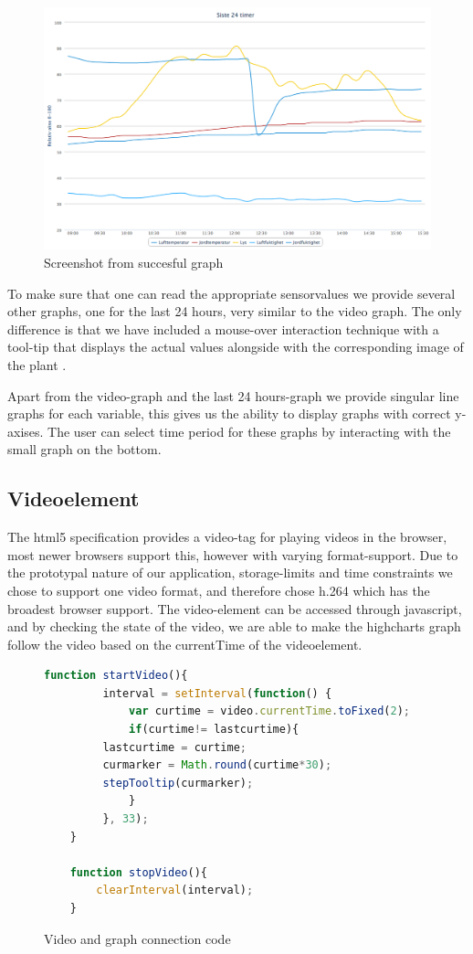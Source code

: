 \begin{figure}
\centering
\includegraphics[width=1\textwidth]{img/interface/goodgraph.png}
\caption{Screenshot from succesful graph}
\label{fig:goodgraph}
\end{figure}

To make sure that one can read the appropriate sensorvalues we provide several other graphs, one for the last 24 hours, very similar to the video graph. The only difference is that we have included a mouse-over interaction technique with a tool-tip that displays the actual values alongside with the corresponding image of the plant \citep[p.254]{kluge2010simulation}.

Apart from the video-graph and the last 24 hours-graph we provide singular line graphs for each variable, this gives us the ability to display graphs with correct y-axises. The user can select time period for these graphs by interacting with the small graph on the bottom. 

\subsection{Videoelement}
The html5 specification provides a video-tag for playing videos in the browser, most newer browsers support this, however with varying format-support. Due to the prototypal nature of our application, storage-limits and time constraints we chose to support one video format, and therefore chose h.264 which has the broadest browser support. The video-element can be accessed through javascript, and by checking the state of the video, we are able to make the highcharts graph follow the video based on the currentTime of the videoelement.

\begin{figure}
	\begin{lstlisting}[language=javascript]
	function startVideo(){
	     interval = setInterval(function() {
	         var curtime = video.currentTime.toFixed(2);
	         if(curtime!= lastcurtime){
		 lastcurtime = curtime;
		 curmarker = Math.round(curtime*30);
		 stepTooltip(curmarker);
	         }
	     }, 33);
	}

	function stopVideo(){
		clearInterval(interval);
	}
	\end{lstlisting}
	\caption{Video and graph connection code}
	\label{fig:videocode}
\end{figure}

